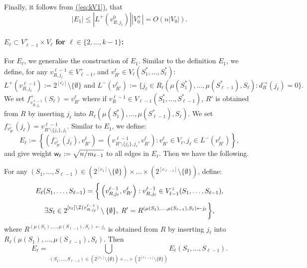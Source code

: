 \documentclass{theoretics}
\newcommand{\eq}[1]{\hyperref[eq:#1]{(\ref*{eq:#1})}}
\renewcommand{\>}{\rangle}
\newcommand{\<}{\langle}
\renewcommand{\(}{\left(}
\renewcommand{\)}{\right)}
\def\abs#1{\left| #1 \right|}
\def\w{{\sf w}}
\begin{document}
Finally, it follows from \eq{kV1}, that 
\begin{equation}
	\abs{E_1} \leq \abs{L^+(v^0_{R,j_1})}\abs{V_0^+} = O\left(n\abs{V_0}\right).\label{eq:kE2}
\end{equation}


\paragraph{$E_{\ell}\subset V_{\ell-1}^+\times V_{\ell}$ for $\ell\in\{2,\dots,k-1\}$:} For $E_{\ell}$, we generalise the construction of $E_1$. Similar to the definition $E_1$, we define, for any $v^{\ell-1}_{R,j_{\ell}}\in V_{\ell-1}^+$, and $v_{R'}^{\ell}\in V_{\ell}(S_1^*,\dots,S_{\ell}^*)$:
$$L^+(v^{\ell-1}_{R,j_{\ell}}):=2^{[c_{\ell}]}\setminus\{\emptyset\}
\mbox{ and }
L^-(v^{\ell}_{R'}):=\{j_{\ell}\in R_{\ell}(\mu(S_1^*),\dots,\mu(S_{\ell-1}^*),S_{\ell}): d_R^{\rightarrow}(j_{\ell})=0\}.$$
We set $f^+_{v^{\ell-1}_{R,j_{\ell}}}(S_{\ell})=v^{\ell}_{R'}$ where if $v^{\ell-1}_R\in V_{\ell-1}(S_1^*,\dots,S_{\ell-1}^*)$, $R'$ is obtained from $R$ by inserting $j_{\ell}$ into $R_{\ell}(\mu(S_1^*),\dots,\mu(S_{\ell-1}^*),S_{\ell})$. We set $f^-_{v^{\ell}_{R'}}(j_{\ell})=v_{R'\setminus\{j_{\ell}\},j_{\ell}}^{\ell-1}$. Similar to $E_1$, we define:
\begin{equation}
{E}_{\ell}:=\left\{\left(f^-_{v^{\ell}_{R'}}(j_{\ell}), v^{\ell}_{R'}\right)=\left(v^{\ell-1}_{R'\setminus\{j_{\ell}\},j_{\ell}},v^{\ell}_{R'}\right): v^{\ell}_{R'}\in V_{\ell}, j_{\ell}\in L^-(v^{\ell}_{R'})\right\},\label{eq:k-dist-E_ell}
\end{equation}
and give weight $\w_{\ell}:=\sqrt{n/m_{\ell-1}}$ to all edges in ${E}_{\ell}$. Then we have the following.
\begin{lemma}\label{lem:k-dist-E-ell}
For any $(S_1,\dots,S_{\ell-1})\in (2^{[c_1]}\setminus\{\emptyset\})\times\dots\times(2^{[c_{\ell-1}]}\setminus\{\emptyset\})$, define:
\begin{multline*}
	{E}_{\ell}(S_1,\dots,S_{\ell-1})=\bigg\{\left(v^{\ell-1}_{R,j_{\ell}},v^{\ell}_{R'}\right): v^{\ell-1}_{R,j_{\ell}}\in V_{\ell-1}^+(S_1,\dots,S_{\ell-1}),\\
	 \exists S_{\ell} \in 2^{[c_{\ell}]\setminus {\cal I}(v^{\ell-1}_{R,j_{\ell}})} \setminus \{\emptyset\},\;
R'=R^{(\mu(S_1),\dots,\mu(S_{\ell-1}),S_{\ell})\leftarrow j_{\ell}} \bigg\},
\end{multline*}
where $R^{(\mu(S_1),\dots,\mu(S_{\ell-1}),S_{\ell})\leftarrow j_{\ell}}$ is obtained from $R$ by inserting $j_{\ell}$ into $R_{\ell}(\mu(S_1),\dots,\mu(S_{\ell-1}),S_{\ell})$. Then
$${E}_{\ell} = \bigcup_{(S_1,\dots,S_{\ell-1})\in (2^{[c_1]}\setminus\{\emptyset\})\times\dots\times(2^{[c_{\ell-1}]}\setminus\{\emptyset\})} {E}_{\ell}(S_1,\dots,S_{\ell-1}).$$
\end{lemma}
\end{document}
